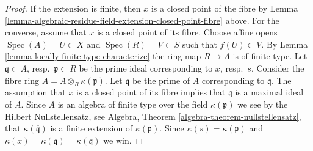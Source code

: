 \documentclass[10pt,a4paper]{amsart}
\theoremstyle{plain}
\theoremstyle{definition}
\theoremstyle{remark}
\numberwithin{equation}{subsection}
\def\Spec{\mathop{\mathrm{Spec}}}
\begin{document}
\begin{proof}
If the extension is finite, then $x$ is a closed point of
the fibre by
Lemma \ref{lemma-algebraic-residue-field-extension-closed-point-fibre}
above. For the converse, assume that $x$ is a closed point
of its fibre. Choose affine opens $\Spec(A) = U \subset X$
and $\Spec(R) = V \subset S$ such that $f(U) \subset V$.
By Lemma \ref{lemma-locally-finite-type-characterize} the ring map
$R \to A$ is of finite type. Let $\mathfrak q \subset A$,
resp.\ $\mathfrak p \subset R$ be the prime ideal corresponding
to $x$, resp.\ $s$. Consider the fibre ring
$\overline{A} = A \otimes_R \kappa(\mathfrak p)$.
Let $\overline{\mathfrak q}$ be the prime of $\overline{A}$
corresponding to $\mathfrak q$. The assumption that $x$
is a closed point of its fibre implies that $\overline{\mathfrak q}$
is a maximal ideal of $\overline{A}$. Since $\overline{A}$
is an algebra of finite type over the field $\kappa(\mathfrak p)$
we see by the Hilbert Nullstellensatz, see
Algebra, Theorem \ref{algebra-theorem-nullstellensatz},
that $\kappa(\overline{\mathfrak q})$ is a finite extension
of $\kappa(\mathfrak p)$.
Since $\kappa(s) = \kappa(\mathfrak p)$ and
$\kappa(x) = \kappa(\mathfrak q) = \kappa(\overline{\mathfrak q})$
we win.
\end{proof}
\end{document}
